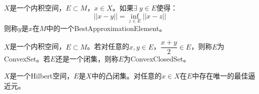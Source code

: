 \begin{definition}
	$X$是一个内积空间，$E\subset M$，$x\in X$。如果$\exists\;y\in E$使得：
	\begin{equation*}
		||x-y||=\inf_{z\in E}||x-z||
	\end{equation*}
	则称$y$是$x$在$M$中的一个\gls{BestApproximationElement}。
\end{definition}
\begin{definition}
	$X$是一个内积空间，$E\subset M$。若对任意的$x,y\in E$，$\dfrac{x+y}{2}\in E$，则称$E$为\gls{ConvexSet}。若$E$还是一个闭集，则称$E$为\gls{ConvexClosedSet}。
\end{definition}
\begin{theorem}\label{theo:BestApproximationElement}
	$X$是一个Hilbert空间，$E$是$X$中的凸闭集。对任意的$x\in X$在$E$中存在唯一的最佳逼近元。
\end{theorem}
